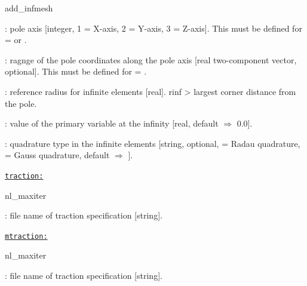 \begin{adescription}{  add\_infmesh}
  \item[  pole\_axis]  : pole axis [integer, 1 = X-axis, 2 = Y-axis, 3 = Z-axis]. This must be defined for \texttt{} = \texttt{} or \texttt{}.
  \item[  axis\_range]: ragnge of the pole coordinates along the pole axis [real two-component vector, optional]. This must be defined for \texttt{} = \texttt{}.
  \item[  rinf]: reference radius for infinite elements [real]. rinf > largest corner distance from the pole.
  \item[  valinf]: value of the primary variable at the infinity [real, default $\Rightarrow$ 0.0].
  \item[  infquad]  : quadrature type in the infinite elements [string, optional, \texttt{} = Radau quadrature, \texttt{} = Gauss quadrature, default $\Rightarrow$ \texttt{}].
  \\
\end{adescription}

\texttt{\underline{traction:}}
\begin{adescription}{nl\_maxiter}
  \item[trfile]: file name of traction specification [string].
  \\
\end{adescription}

\texttt{\underline{mtraction:}}
\begin{adescription}{nl\_maxiter}
  \item[trfile]: file name of traction specification [string].
  \\
\end{adescription}

